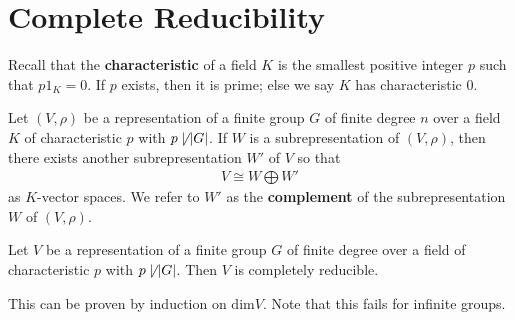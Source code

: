 \documentclass{memoir}
\begin{document}


\section{Complete Reducibility}
\label{sec:complete_reducibility}

Recall that the \textbf{characteristic} of a field \(K\) is the smallest positive integer \(p\) such that \(p 1_K = 0\). If \(p\) exists, then it is prime; else we say \(K\) has characteristic 0.

\begin{thm}
	Let \((V,\rho)\) be a representation of a finite group \(G\) of finite degree \(n\) over a field \(K\) of characteristic \(p\) with \(p \not\mid \left| G \right| \). If \(W\) is a subrepresentation of \((V,\rho)\), then there exists another subrepresentation \(W'\) of \(V\) so that
	\begin{align*}
		V \cong W \bigoplus W'
	\end{align*}
	as \(K\)-vector spaces. We refer to \(W'\) as the \textbf{complement} of the subrepresentation \(W\) of \((V,\rho)\).
\end{thm}

\begin{cor}
	Let \(V\) be a representation of a finite group \(G\) of finite degree over a field of characteristic \(p\) with \(p \not\mid \left| G \right| \). Then \(V\) is completely reducible.
\end{cor}

This can be proven by induction on \(\textrm{dim}V\). Note that this fails for infinite groups.
\end{document}
